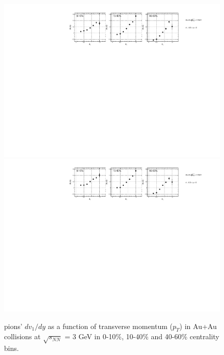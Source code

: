 \begin{figure}[h]
\includegraphics[scale=0.5]{FXT3gev/chapter3/fig/v1ptpikp/pip_dv1pt_widecent.pdf}
\includegraphics[scale=0.5]{FXT3gev/chapter3/fig/v1ptpikp/pim_dv1pt_widecent.pdf}
\caption{pions' $dv_{1}/dy$ as a function of transverse momentum ($p_{T}$) in Au+Au collisions at $\sqrt{s_{NN}}$ = 3 GeV in 0-10\%, 10-40\% and 40-60\% centrality bins.}
\label{pion_dv1pt_widecent}
\end{figure}

\clearpage

